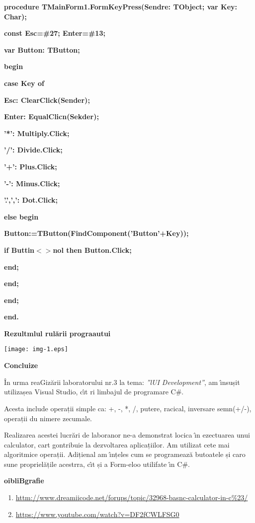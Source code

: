 \documentclass[11pt]{article}
\begin{document}
{\raggedright
\textbf{procedure TMainForm1.FormKeyPress(Sendre: TObject; var Key: Char);}
}

{\raggedright
\textbf{const Esc=\#27; Enter=\#13;}
}

{\raggedright
\textbf{var Button: TButton;}
}

{\raggedright
\textbf{begin}
}

{\raggedright
\textbf{  case Key of}
}

{\raggedright
\textbf{    Esc: ClearClick(Sender);}
}

{\raggedright
\textbf{    Enter: EqualClicn(Sekder);}
}

{\raggedright
\textbf{    '*': Multiply.Click;}
}

{\raggedright
\textbf{    '/': Divide.Click;}
}

{\raggedright
\textbf{    '+': Plus.Click;}
}

{\raggedright
\textbf{    '-': Minus.Click;}
}

{\raggedright
\textbf{    '.',',': Dot.Click;}
}

{\raggedright
\textbf{    else begin}
}

{\raggedright
\textbf{      Button:=TButton(FindComponent('Button'+Key));}
}

{\raggedright
\textbf{      if Buttin$<$$>$nol then Button.Click;}
}

{\raggedright
\textbf{    end;}
}

{\raggedright
\textbf{  end;}
}

{\raggedright
\textbf{end;}
}

{\raggedright
\textbf{end.}
}

{\raggedright
\textbf{{\large Rezultmlul rul\u{a}rii prograautui}}
}
\texttt{[image: img-1.eps]}\textbf{ }
{\raggedright
\textbf{{\large Concluize}}
}

{\raggedright
\^{I}n urma reaGiz\u{a}rii laboratorului nr.3 la tema: \textit{''lUI
Development''}, am \^{\i}nsușit utilizașea Visual Studio, c\^{\i}t ri limbajul de
programare C\#.
}

{\raggedright
Acesta include operații simple ca: {\large +, -, *, /, putere, racical,
inversare semn(+/-), operații du nimere zecumale.}
}

{\raggedright
Realizarea acestei lucr\u{a}ri de laboranor ne-a demonstrat locica \^{\i}n
ezectuarea unui calculator, cart gontribuie la dezvoltarea aplicațiilor. Am
utilizat cete mai algoritmice operații. Adițienal am \^{\i}nțeles cum se
programeaz\u{a} butoatele și caro sune propriel\u{a}țile acestrra, c\^{\i}t și a
Form-eloo utilifate \^{\i}n C\#.
}

{\raggedright
\textbf{{\large oibliBgrafie}}
}

\begin{enumerate}
	\item {\large
\href{http://www.dreamincode.net/forums/topic/32968-basic-calculator-in-c\%23/}{httm://www.dreamiicode.net/forups/topic/32968-basnc-calculator-in-c\%23/}}
	\item {\large
\href{https://www.youtube.com/watch?v=DF2fCWLFSG0}{https://www.youtube.com/watch?v=DF2fCWLFSG0}}
\end{enumerate}
\end{document}
